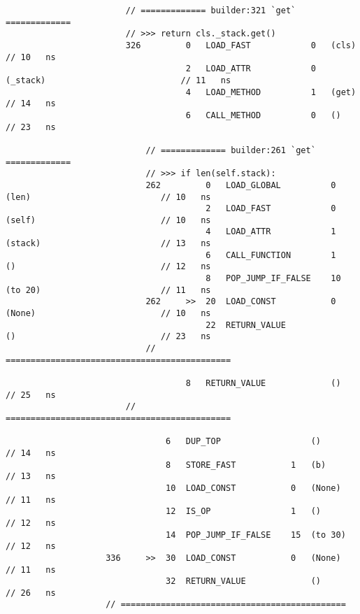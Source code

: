 \begin{code}
\begin{verbatim}
                        // ============= builder:321 `get` =============
                        // >>> return cls._stack.get()
                        326         0   LOAD_FAST            0   (cls)                              // 10   ns
                                    2   LOAD_ATTR            0   (_stack)                           // 11   ns
                                    4   LOAD_METHOD          1   (get)                              // 14   ns
                                    6   CALL_METHOD          0   ()                                 // 23   ns

                            // ============= builder:261 `get` =============
                            // >>> if len(self.stack):
                            262         0   LOAD_GLOBAL          0   (len)                          // 10   ns
                                        2   LOAD_FAST            0   (self)                         // 10   ns
                                        4   LOAD_ATTR            1   (stack)                        // 13   ns
                                        6   CALL_FUNCTION        1   ()                             // 12   ns
                                        8   POP_JUMP_IF_FALSE    10  (to 20)                        // 11   ns
                            262     >>  20  LOAD_CONST           0   (None)                         // 10   ns
                                        22  RETURN_VALUE             ()                             // 23   ns
                            // =============================================

                                    8   RETURN_VALUE             ()                                 // 25   ns
                        // =============================================

                                6   DUP_TOP                  ()                                     // 14   ns
                                8   STORE_FAST           1   (b)                                    // 13   ns
                                10  LOAD_CONST           0   (None)                                 // 11   ns
                                12  IS_OP                1   ()                                     // 12   ns
                                14  POP_JUMP_IF_FALSE    15  (to 30)                                // 12   ns
                    336     >>  30  LOAD_CONST           0   (None)                                 // 11   ns
                                32  RETURN_VALUE             ()                                     // 26   ns
                    // =============================================


\end{verbatim}
\end{code}
